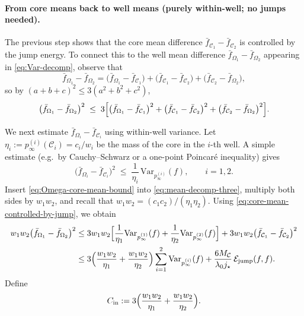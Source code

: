 \paragraph{From core means back to well means (purely within-well; no jumps needed).}

The previous step shows that the core mean difference
\(\bar f_{\mathcal C_1}-\bar f_{\mathcal C_2}\) is controlled by the jump energy.
To connect this to the well mean difference
\(\bar f_{\Omega_1}-\bar f_{\Omega_2}\) appearing in \eqref{eq:Var-decomp},
observe that
\[
\bar f_{\Omega_1}-\bar f_{\Omega_2}
=
\bigl(\bar f_{\Omega_1}-\bar f_{\mathcal C_1}\bigr)
+
\bigl(\bar f_{\mathcal C_1}-\bar f_{\mathcal C_2}\bigr)
+
\bigl(\bar f_{\mathcal C_2}-\bar f_{\Omega_2}\bigr),
\]
so by \((a+b+c)^2\le 3(a^2+b^2+c^2)\),
\begin{equation}\label{eq:mean-decomp-three}
\bigl(\bar f_{\Omega_1}-\bar f_{\Omega_2}\bigr)^2
\;\le\;
3\Bigl[
\bigl(\bar f_{\Omega_1}-\bar f_{\mathcal C_1}\bigr)^2
+
\bigl(\bar f_{\mathcal C_1}-\bar f_{\mathcal C_2}\bigr)^2
+
\bigl(\bar f_{\mathcal C_2}-\bar f_{\Omega_2}\bigr)^2
\Bigr].
\end{equation}

We next estimate \(\bar f_{\Omega_i}-\bar f_{\mathcal C_i}\) using within-well variance.
Let
\(
\eta_i := p_\infty^{(i)}(\mathcal C_i)=c_i/w_i
\)
be the mass of the core in the \(i\)-th well.
A simple estimate (e.g.\ by Cauchy–Schwarz or a one-point Poincaré inequality)
gives
\begin{equation}\label{eq:Omega-core-mean-bound}
\bigl(\bar f_{\Omega_i}-\bar f_{\mathcal C_i}\bigr)^2
\;\le\;
\frac{1}{\eta_i}\,
\mathrm{Var}_{p_\infty^{(i)}}(f),
\qquad
i=1,2.
\end{equation}
Insert \eqref{eq:Omega-core-mean-bound} into \eqref{eq:mean-decomp-three},
multiply both sides by \(w_1w_2\), and recall that
\(w_1w_2=(c_1c_2)/(\eta_1\eta_2)\).
Using \eqref{eq:core-mean-controlled-by-jump}, we obtain
\begin{align}
w_1w_2\bigl(\bar f_{\Omega_1}-\bar f_{\Omega_2}\bigr)^2
&\le
3w_1w_2\Bigl[
\frac{1}{\eta_1}\mathrm{Var}_{p_\infty^{(1)}}(f)
+
\frac{1}{\eta_2}\mathrm{Var}_{p_\infty^{(2)}}(f)
\Bigr]
+
3w_1w_2\bigl(\bar f_{\mathcal C_1}-\bar f_{\mathcal C_2}\bigr)^2
\nonumber\\
&\le
3\Bigl(\frac{w_1w_2}{\eta_1}+\frac{w_1w_2}{\eta_2}\Bigr)
\sum_{i=1}^2\mathrm{Var}_{p_\infty^{(i)}}(f)
+
\frac{6M_{\mathcal C}}{\lambda_0j_\star}\,
\mathcal E_{\mathrm{jump}}(f,f).\label{eq:between-pre-lambda}
\end{align}
Define
\begin{equation}\label{eq:Cin-def}
C_{\mathrm{in}}
:=3\Bigl(\frac{w_1w_2}{\eta_1}+\frac{w_1w_2}{\eta_2}\Bigr).
\end{equation}


